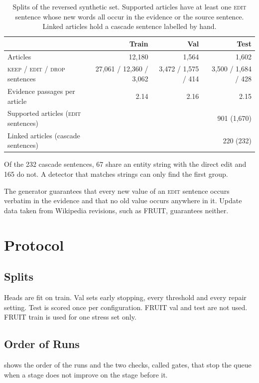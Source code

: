 \documentclass[]{paper}
\newcommand{\keep}{\textsc{keep}}
\newcommand{\edit}{\textsc{edit}}
\newcommand{\drop}{\textsc{drop}}
\begin{document}
\begin{table}[H]
\caption{Splits of the reversed synthetic set. Supported articles have at least one \edit{} sentence whose new words all occur in the evidence or the source sentence. Linked articles hold a cascade sentence labelled by hand.}
\label{tab:data}
\centering
\footnotesize
\begin{tabular}{lrrr}
\toprule
 & Train & Val & Test \\
\midrule
Articles & 12,180 & 1,564 & 1,602 \\
\keep{} / \edit{} / \drop{} sentences & 27,061 / 12,360 / 3,062 & 3,472 / 1,575 / 414 & 3,500 / 1,684 / 428 \\
Evidence passages per article & 2.14 & 2.16 & 2.15 \\
Supported articles (\edit{} sentences) & & & 901 (1,670) \\
Linked articles (cascade sentences) & & & 220 (232) \\
\bottomrule
\end{tabular}
\end{table}

Of the 232 cascade sentences, 67 share an entity string with the direct edit and 165 do not. A detector that matches strings can only find the first group.

The generator guarantees that every new value of an \edit{} sentence occurs verbatim in the evidence and that no old value occurs anywhere in it. Update data taken from Wikipedia revisions, such as FRUIT, guarantees neither.

\section{Protocol}
\label{sec:protocol}

\subsection{Splits}

Heads are fit on train. Val sets early stopping, every threshold and every repair setting. Test is scored once per configuration. FRUIT val and test are not used. FRUIT train is used for one stress set only.

\subsection{Order of Runs}

 shows the order of the runs and the two checks, called gates, that stop the queue when a stage does not improve on the stage before it.
\end{document}
